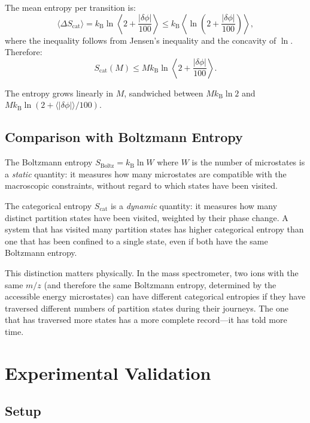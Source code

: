 \documentclass[twocolumn,10pt]{article}
\newcommand{\kB}{k_{\mathrm{B}}}
\newcommand{\Scat}{S_{\mathrm{cat}}}
\begin{document}
The mean entropy per transition is:
\begin{equation}
    \langle \Delta\Scat \rangle = \kB \ln\left\langle 2 + \frac{|\delta\phi|}{100} \right\rangle \leq \kB\left\langle\ln\left(2 + \frac{|\delta\phi|}{100}\right)\right\rangle,
\end{equation}
where the inequality follows from Jensen's inequality and the concavity of $\ln$. Therefore:
\begin{equation}
    \Scat(M) \leq M \kB \ln\left\langle 2 + \frac{|\delta\phi|}{100}\right\rangle.
\end{equation}

The entropy grows linearly in $M$, sandwiched between $M\kB\ln 2$ and $M\kB\ln(2 + \langle|\delta\phi|\rangle/100)$.

\subsection{Comparison with Boltzmann Entropy}

The Boltzmann entropy $S_{\mathrm{Boltz}} = \kB \ln W$ where $W$ is the number of microstates is a \emph{static} quantity: it measures how many microstates are compatible with the macroscopic constraints, without regard to which states have been visited.

The categorical entropy $\Scat$ is a \emph{dynamic} quantity: it measures how many distinct partition states have been visited, weighted by their phase change. A system that has visited many partition states has higher categorical entropy than one that has been confined to a single state, even if both have the same Boltzmann entropy.

This distinction matters physically. In the mass spectrometer, two ions with the same $m/z$ (and therefore the same Boltzmann entropy, determined by the accessible energy microstates) can have different categorical entropies if they have traversed different numbers of partition states during their journeys. The one that has traversed more states has a more complete record---it has told more time.

\section{Experimental Validation}
\label{sec:validation}

\subsection{Setup}
\end{document}
